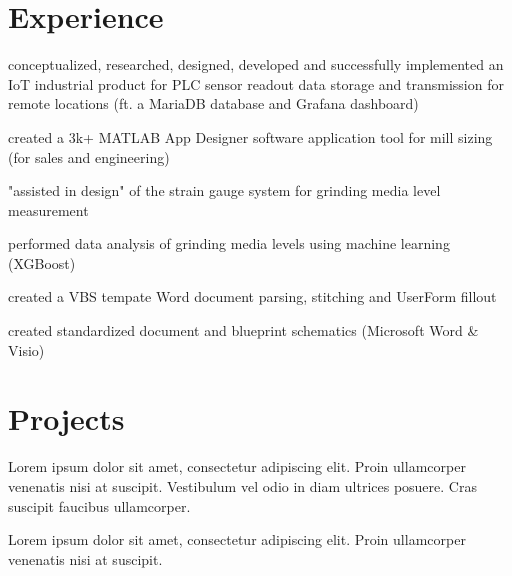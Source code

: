 \documentclass[]{plushcv}
\begin{document}

\vspace*{1cm}
\begin{minipage}[t]{0.70\textwidth} 

\section{Experience}
	\vspace{\topsep} %
	\begin{tightemize}
		\item conceptualized, researched, designed, developed and successfully implemented an IoT industrial product for PLC sensor readout data storage and transmission for remote locations (ft. a MariaDB database and Grafana dashboard)
		\item created a 3k+ MATLAB App Designer software application tool for mill sizing (for sales and engineering)
		\item "assisted in design" of the strain gauge system for grinding media level measurement
	\end{tightemize}
	\subskip
	
	\begin{tightemize}
		\item performed data analysis of grinding media levels using machine learning (XGBoost)
		\item created a VBS tempate Word document parsing, stitching and UserForm fillout
		\item created standardized document and blueprint schematics (Microsoft Word \& Visio)
	\end{tightemize}



\section{Projects}
	\begin{tightemize}
	\item Lorem ipsum dolor sit amet, consectetur adipiscing elit. Proin ullamcorper venenatis nisi at suscipit. Vestibulum vel odio in diam ultrices posuere. Cras suscipit faucibus ullamcorper.
	\item Lorem ipsum dolor sit amet, consectetur adipiscing elit. Proin ullamcorper venenatis nisi at suscipit.
	\end{tightemize}
	\sectionsep
	

\end{minipage}
\end{document}
